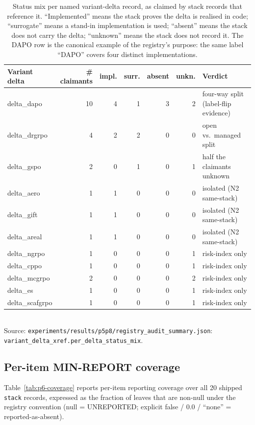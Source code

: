 \documentclass{article}
\begin{document}
\begin{table}[t]
\centering
\caption{Status mix per named variant-delta record, as claimed by stack
records that reference it. ``Implemented'' means the stack proves the
delta is realised in code; ``surrogate'' means a stand-in implementation
is used; ``absent'' means the stack does not carry the delta; ``unknown''
means the stack does not record it. The DAPO row is the canonical example
of the registry's purpose: the same label ``DAPO'' covers four distinct
implementations.}
\label{tab:p6-delta-mix}
\small
\begin{tabular}{lrrrrrl}
\toprule
Variant delta & \# claimants & impl. & surr. & absent & unkn. & Verdict \\
\midrule
delta\_dapo      & 10 & 4 & 1 & 3 & 2 & four-way split (label-flip evidence) \\
delta\_drgrpo    &  4 & 2 & 2 & 0 & 0 & open vs.\ managed split \\
delta\_gspo      &  2 & 0 & 1 & 0 & 1 & half the claimants unknown \\
delta\_aero      &  1 & 1 & 0 & 0 & 0 & isolated (N2 same-stack) \\
delta\_gift      &  1 & 1 & 0 & 0 & 0 & isolated (N2 same-stack) \\
delta\_areal     &  1 & 1 & 0 & 0 & 0 & isolated (N2 same-stack) \\
delta\_ngrpo     &  1 & 0 & 0 & 0 & 1 & risk-index only \\
delta\_cppo      &  1 & 0 & 0 & 0 & 1 & risk-index only \\
delta\_mcgrpo    &  2 & 0 & 0 & 0 & 2 & risk-index only \\
delta\_es        &  1 & 0 & 0 & 0 & 1 & risk-index only \\
delta\_scafgrpo  &  1 & 0 & 0 & 0 & 1 & risk-index only \\
\bottomrule
\end{tabular}\\
\footnotesize{Source:
\texttt{experiments/results/p5p8/registry\_audit\_summary.json}:
\texttt{variant\_delta\_xref.per\_delta\_status\_mix}.}
\end{table}

\subsection{Per-item MIN-REPORT coverage}
Table~\ref{tab:p6-coverage} reports per-item reporting coverage over
all 20 shipped \texttt{stack} records, expressed as the fraction of
leaves that are non-null under the registry convention (null =
UNREPORTED; explicit false / 0.0 / ``none'' = reported-as-absent).
\end{document}

